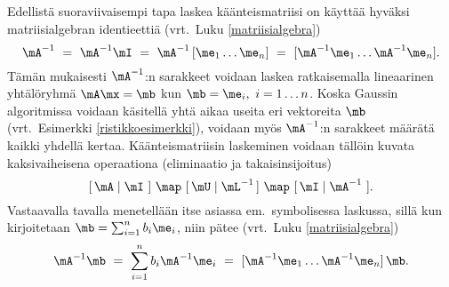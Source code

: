 Edellistä suoraviivaisempi tapa laskea käänteismatriisi on käyttää hyväksi matriisialgebran
identieettiä (vrt.\ Luku \ref{matriisialgebra})
\[
\mA^{-1}\ =\ \mA^{-1} \mI\ =\ \mA^{-1}\,[\me_1 \ldots \me_n]\ 
                           =\  [\mA^{-1}\me_1 \ldots \mA^{-1}\me_n].
\]
Tämän mukaisesti $\mA^{-1}$:n sarakkeet voidaan laskea ratkaisemalla lineaarinen yhtälöryhmä
$\mA \mx = \mb$ kun $\mb = \me_i,\ i = 1 \ldots n$. Koska Gaussin algoritmissa voidaan käsitellä
yhtä aikaa useita eri vektoreita $\mb$ (vrt.\ Esimerkki \ref{ristikkoesimerkki}), voidaan myös 
$\mA^{-1}$:n sarakkeet määrätä kaikki yhdellä kertaa. Käänteismatriisin laskeminen voidaan 
tällöin kuvata kaksivaiheisena operaationa (eliminaatio ja takaisinsijoitus)
\[
 [\,\mA \mid \mI\ ]\ \map\ [\,\mU \mid \mL^{-1}\,]\ \map\ [\,\mI \mid \mA^{-1}\ ].
\]
Vastaavalla tavalla menetellään itse asiassa em.\ symbolisessa laskussa, sillä kun kirjoitetaan
$\mb = \sum_{i=1}^n b_i \me_i$, niin pätee (vrt.\ Luku \ref{matriisialgebra})
\[
\mA^{-1} \mb\ =\ \sum_{i=1}^n b_i \mA^{-1} \me_i\ =\ [\mA^{-1} \me_1 \ldots \mA^{-1} \me_n]\,\mb.
\]

